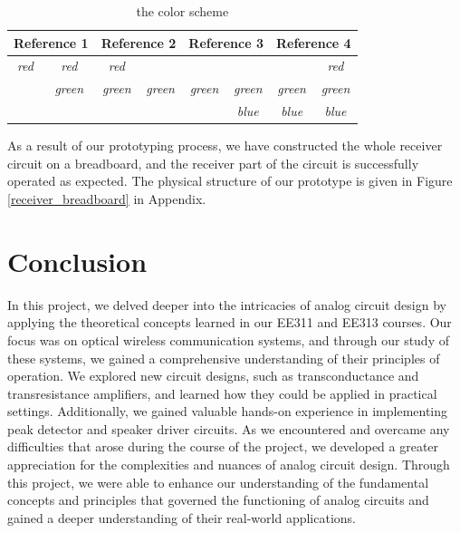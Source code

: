 \documentclass[a4paper,10pt]{IEEEtran}
\begin{document}
\begin{table}[]
    \caption{the color scheme}
    \label{tab:array}
    \begin{tabular}{|cc|cc|cc|cc|}
    \hline
    \multicolumn{2}{|c|}{\textbf{Reference 1}}          & \multicolumn{2}{c|}{\textbf{Reference 2}}            & \multicolumn{2}{c|}{\textbf{Reference 3}}            & \multicolumn{2}{c|}{\textbf{Reference 4}}            \\ \hline
    \multicolumn{1}{|c|}{\textit{red}} & \textit{red}   & \multicolumn{1}{c|}{\textit{red}}   & \textit{}      & \multicolumn{1}{c|}{\textit{}}      & \textit{}      & \multicolumn{1}{c|}{\textit{}}      & \textit{red}   \\ \hline
    \multicolumn{1}{|c|}{\textit{}}    & \textit{green} & \multicolumn{1}{c|}{\textit{green}} & \textit{green} & \multicolumn{1}{c|}{\textit{green}} & \textit{green} & \multicolumn{1}{c|}{\textit{green}} & \textit{green} \\ \hline
    \multicolumn{1}{|c|}{\textit{}}    & \textit{}      & \multicolumn{1}{c|}{\textit{}}      & \textit{}      & \multicolumn{1}{c|}{\textit{}}      & \textit{blue}  & \multicolumn{1}{c|}{\textit{blue}}  & \textit{blue}  \\ \hline
    \end{tabular}
\end{table}
As a result of our prototyping process, we have constructed the whole receiver circuit on a breadboard, and the receiver part of the circuit is successfully operated as expected. The physical structure of our prototype is given in Figure \ref{receiver_breadboard} in Appendix.
\section{Conclusion}
In this project, we delved deeper into the intricacies of analog circuit design by applying the theoretical concepts learned in our EE311 and EE313 courses. Our focus was on optical wireless communication systems, and through our study of these systems, we gained a comprehensive understanding of their principles of operation. We explored new circuit designs, such as transconductance and transresistance amplifiers, and learned how they could be applied in practical settings. Additionally, we gained valuable hands-on experience in implementing peak detector and speaker driver circuits. As we encountered and overcame any difficulties that arose during the course of the project, we developed a greater appreciation for the complexities and nuances of analog circuit design. Through this project, we were able to enhance our understanding of the fundamental concepts and principles that governed the functioning of analog circuits and gained a deeper understanding of their real-world applications.
\end{document}
